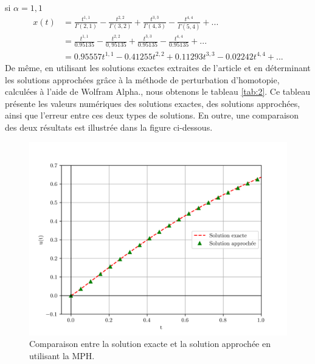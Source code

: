 si $\alpha = 1,1$
\begin{align*}
    x(t) &= \frac{t^{1,1}}{\Gamma(2,1)} - \frac{t^{2,2}}{\Gamma(3,2)} +\frac{t^{3,3}}{\Gamma(4,3)} - \frac{t^{4,4}}{\Gamma(5,4)}+...\\
    &= \frac{t^{1,1}}{0.95135} - \frac{t^{2,2}}{0,95135} +\frac{t^{3,3}}{0.95135} - \frac{t^{4,4}}{0.95135}+...\\
    & = 0.95557t^{1,1} - 0.41255t^{2,2} + 0.11293t^{3,3}- 0.02242 t^{4,4} + ...
\end{align*}
De même, en utilisant les solutions exactes extraites de l'article \cite{Numerical_sol} et en déterminant les solutions approchées grâce à la méthode de perturbation d'homotopie, calculées à l'aide de Wolfram Alpha., nous obtenons le tableau \ref{tab:2}. Ce tableau présente les valeurs numériques des solutions exactes, des solutions approchées, ainsi que l'erreur entre ces deux types de solutions. En outre, une comparaison des deux résultats est illustrée dans la figure ci-dessous.
\begin{figure}[H]
    \centering
    \includegraphics[scale = 0.7]{IMAGES/plot (6).png}
    \caption{Comparaison entre la solution exacte et la solution approchée en utilisant la MPH.}
\end{figure}